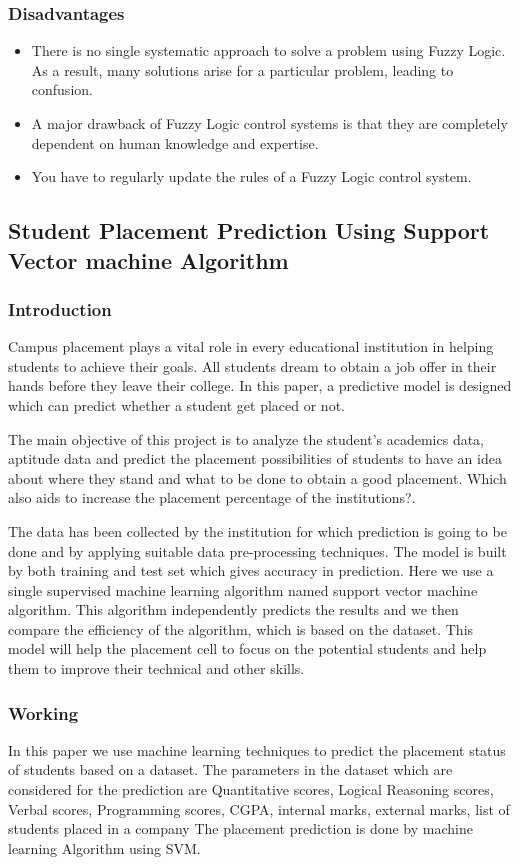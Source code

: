 \documentclass[12pt]{article}
\begin{document}
\subsubsection{Disadvantages}
\begin{itemize}
\item There is no single systematic approach to solve a problem using Fuzzy Logic. As a result, many solutions arise for a particular problem, leading to confusion.
\item A major drawback of Fuzzy Logic control systems is that they are completely dependent on human knowledge and expertise.
\item You have to regularly update the rules of a Fuzzy Logic control system.
\end{itemize}


\newpage
\subsection{Student Placement Prediction Using Support Vector machine Algorithm}
\subsubsection{Introduction}
Campus placement plays a vital role in every educational institution in helping students to achieve their goals.
All students dream to obtain a job offer in their hands before they leave their college. In this paper, a predictive model is 
designed which can predict whether a student get placed or not. 

The main objective of this project is to analyze the student’s academics data, aptitude data and predict the placement possibilities of students to have an idea about where they stand and what to be done to obtain a good placement. Which also aids to increase the placement percentage of the institutions?.

The data has been collected by the institution for which prediction is going to be done and by applying 
suitable data pre-processing techniques. The model is built by both training and test set which gives accuracy in 
prediction. Here we use a single supervised machine learning algorithm named support vector machine algorithm. This 
algorithm independently predicts the results and we then compare the efficiency of the algorithm, which is based on the 
dataset. This model will help the placement cell to focus on the potential students and help them to improve their technical 
and other skills.
\newpage
\subsubsection{Working}
In this paper we use machine learning techniques to predict the placement status of students based on a dataset. The 
parameters in the dataset which are considered for the prediction are Quantitative scores, Logical Reasoning scores, 
Verbal scores, Programming scores, CGPA, internal marks, external marks, list of students placed in a company The 
placement prediction is done by machine learning Algorithm using SVM.
\end{document}
